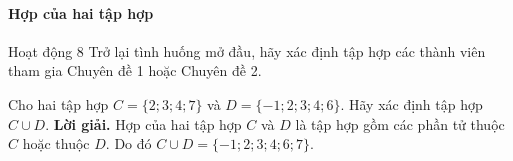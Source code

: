 \begin{kienthuc}
	\paragraph{Hợp của hai tập hợp}
	\begin{hoatdong}{Hoạt động 8}
		Trở lại tình huống mở đầu, hãy xác định tập hợp các thành viên tham gia Chuyên đề 1 hoặc Chuyên đề 2.
	\end{hoatdong}
	\begin{vd}
		Cho hai tập hợp $C = \{2; 3; 4; 7\}$ và $D = \{-1; 2; 3; 4; 6\}$. Hãy xác định tập hợp $C \cup D$.
		\textbf{Lời giải.}
		Hợp của hai tập hợp $C$ và $D$ là tập hợp gồm các phần tử thuộc $C$ hoặc thuộc $D$. Do đó $C \cup D = \{-1; 2; 3; 4; 6; 7\}$.
	\end{vd}


\end{kienthuc}
